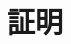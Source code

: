 \documentclass[dvipdfmx,10pt,notheorems]{beamer}
\theoremstyle{definition}
\newcommand{\lang}[1]{\mathcal{L}_{\scalebox{1.2}{$#1$}}} %
\begin{document}
\section{証明}
%	
\end{document}
